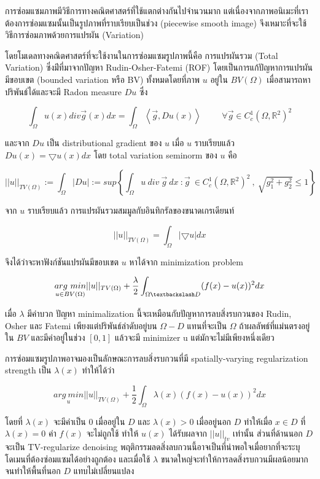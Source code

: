 \documentclass[hidelinks,a4paper,14pt]{article}
\numberwithin{equation}{section}							%
\begin{document}
{	การซ่อมแซมภาพมีวิธีการทางคณิตศาสตร์ที่ใช้แตกต่างกันไปจำนวนมาก แต่เนื่องจากภาพอนิเมะที่เราต้องการซ่อมแซมนั้นเป็นรูปภาพที่ราบเรียบเป็นช่วง (piecewise smooth image) จึงเหมาะที่จะใช้วิธีการซ่อมภาพด้วยการแปรผัน (Variation) 
	
	โดยโมเดลทางคณิตศาสตร์ที่จะใช้งานในการซ่อมแซมรูปภาพนี้คือ การแปรผันรวม (Total Variation)  ซึ่งม่ีที่มาจากปัญหา Rudin-Osher-Fatemi (ROF) โดยเป็นการแก้ปัญหาการแปรผันมีขอบเขต (bounded variation หรือ BV) ทั้งหมดโดยที่ภาพ $u$ อยู่ใน $BV(\Omega)$ เมื่อสามารถหาปริพันธ์ได้และจะมี Radon measure $Du$ ซึ่ง 
	
	$$\int_{\Omega}u(x) div \vec{g}(x) dx = \int_{\Omega} \left\langle\vec{g},Du(x) \right\rangle\hspace{1cm}\forall\vec{g} \in C_c^1(\Omega,\mathbb{R}^2)^2$$
	
	และจาก $Du$ เป็น distributional gradient ของ $u$ เมื่อ $u$ ราบเรียบแล้ว  $Du(x)= \bigtriangledown u(x)dx $
	โดย total variation seminorm ของ $u$ คือ 
	
	$$ ||u||_{TV(\Omega)} := \int_{\Omega} | Du | := sup{ \left \{ \int_{\Omega}  u \ div  \ \vec{g} \ dx \  : \vec{g} \  \in C_c^1(\Omega,\mathbb{R}^2)^2 \ , \ \sqrt{g_1^2+g_2^2} \leq 1 \right \} }  $$
	
	จาก $u$ ราบเรียบแล้ว การแปรผันรวมสมมูลกับอินทิกรัลของขนาดเกรเดียนท์ 
	
	$$ ||u||_{TV(\Omega)} = \int_{\Omega} | \bigtriangledown u | dx$$
	
	จึงได้ว่าจะหาฟังก์ชันแปรผันมีขอบเขต $u$ หาได้จาก minimization problem
	
	$$ \underset{u \in BV(\Omega)}{arg \ min} ||u||_{TV(\Omega)} + \frac{\lambda}{2} \int_{\Omega \textbackslash D} (f(x) - u(x))^2 dx$$
	
	เมื่อ $\lambda$ มีค่าบวก ปัญหา minimalization นี้จะเหมือนกับปัญหาการลบสิ่งรบกวนของ Rudin, Osher และ Fatemi เพียงแต่ปริพันธ์ลำดับอยู่บน $\Omega-D$  แทนที่จะเป็น $\Omega$ ถ้าผลลัพธ์ที่แม่นตรงอยู่ใน $BV$ และมีค่าอยู่ในช่วง $[0,1]$ แล้วจะมี minimizer u แต่มักจะไม่มีเพียงหนึ่งเดียว
	
	การซ่อมแซมรูปภาพอาจมองเป็นลักษณะการลบสิ่งรบกวนที่มี spatially-varying regularization strength เป็น $\lambda(x)$ ทำให้ได้ว่า
	
		$$\underset{u}{{arg \ min}} ||u||_{TV(\Omega)} + \frac{1}{2} \int_{\Omega} \lambda(x)(f(x) - u(x))^2 dx$$
		
	โดยที่ $\lambda(x)$ จะมีค่าเป็น $0$ เมื่ออยู่ใน $D$ และ $\lambda(x)>0$ เมื่ออยู่นอก $D$  ทำให้เมื่อ $x \in D$ ที่ $\lambda(x)=0$ ค่า $f(x)$ จะไม่ถูกใช้ ทำให้ $u(x)$ ได้รับผลจาก $||u||_{tv}$ เท่านั้น ส่วนที่ด้านนอก $D$ จะเป็น TV-regularize denoising พฤติกรรมลดสิ่งลบกวนนี้อาจเป็นที่น่าพอใจเมื่อยากที่จะระบุโดเมนที่ต้องซ่อมแซมได้อย่างถูกต้อง และเมื่อใช้ $λ$ ขนาดใหญ่จะทำให้การลดสิ่งรบกวนมีผลน้อยมากจนทำให้พื้นที่นอก $D$  แทบไม่เปลี่ยนแปลง
	
}
\end{document}

